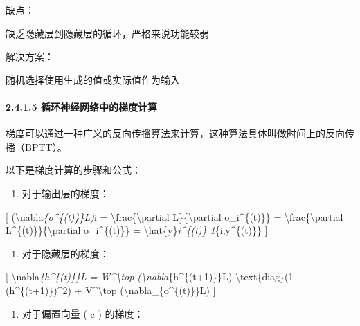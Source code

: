 缺点：

缺乏隐藏层到隐藏层的循环，严格来说功能较弱

解决方案：

随机选择使用生成的值或实际值作为输入

\paragraph{\texorpdfstring{\textbf{2.4.1.5
循环神经网络中的梯度计算}}{2.4.1.5 循环神经网络中的梯度计算}}\label{2415-ux5faaux73afux795eux7ecfux7f51ux7edcux4e2dux7684ux68afux5ea6ux8ba1ux7b97}


梯度可以通过一种广义的反向传播算法来计算，这种算法具体叫做时间上的反向传播（BPTT）。

以下是梯度计算的步骤和公式：

\begin{enumerate}
\def\labelenumi{\arabic{enumi}.}
\item
  对于输出层的梯度：
\end{enumerate}

{[} (\textbackslash nabla\emph{\{o\^{}\{(t)\}\}L)}i =
\textbackslash frac\{\textbackslash partial L\}\{\textbackslash partial
o\_i\^{}\{(t)\}\} = \textbackslash frac\{\textbackslash partial
L\^{}\{(t)\}\}\{\textbackslash partial o\_i\^{}\{(t)\}\} =
\textbackslash hat\{y\}\emph{i\^{}\{(t)\} 1}\{i,y\^{}\{(t)\}\} {]}


\begin{enumerate}
\def\labelenumi{\arabic{enumi}.}
\item
  对于隐藏层的梯度：
\end{enumerate}

{[} \textbackslash nabla\emph{\{h\^{}\{(t)\}\}L =
W\^{}\textbackslash top (\textbackslash nabla}\{h\^{}\{(t+1)\}\}L)
\textbackslash text\{diag\}(1 (h\^{}\{(t+1)\})\^{}2) +
V\^{}\textbackslash top (\textbackslash nabla\_\{o\^{}\{(t)\}\}L) {]}


\begin{enumerate}
\def\labelenumi{\arabic{enumi}.}
\item
  对于偏置向量 ( c ) 的梯度：
\end{enumerate}

